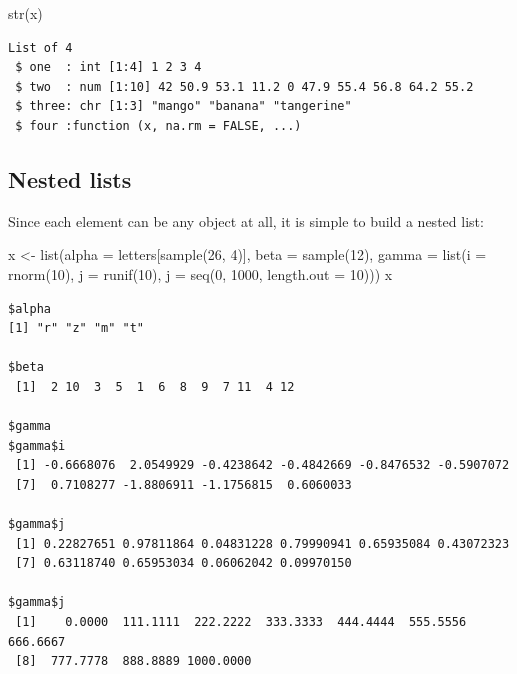 \documentclass[
]{book}
\newenvironment{Shaded}{\begin{snugshade}}{\end{snugshade}}
\newcommand{\AttributeTok}[1]{\textcolor[rgb]{0.77,0.63,0.00}{#1}}
\newcommand{\DecValTok}[1]{\textcolor[rgb]{0.00,0.00,0.81}{#1}}
\newcommand{\FunctionTok}[1]{\textcolor[rgb]{0.00,0.00,0.00}{#1}}
\newcommand{\NormalTok}[1]{#1}
\newcommand{\OtherTok}[1]{\textcolor[rgb]{0.56,0.35,0.01}{#1}}
\begin{document}
\begin{Shaded}
\begin{Highlighting}[]
\FunctionTok{str}\NormalTok{(x)}
\end{Highlighting}
\end{Shaded}

\begin{verbatim}
List of 4
 $ one  : int [1:4] 1 2 3 4
 $ two  : num [1:10] 42 50.9 53.1 11.2 0 47.9 55.4 56.8 64.2 55.2
 $ three: chr [1:3] "mango" "banana" "tangerine"
 $ four :function (x, na.rm = FALSE, ...)  
\end{verbatim}

\hypertarget{nested-lists}{%
\subsection{Nested lists}\label{nested-lists}}

Since each element can be any object at all, it is simple to build a nested list:

\begin{Shaded}
\begin{Highlighting}[]
\NormalTok{x }\OtherTok{\textless{}{-}} \FunctionTok{list}\NormalTok{(}\AttributeTok{alpha =}\NormalTok{ letters[}\FunctionTok{sample}\NormalTok{(}\DecValTok{26}\NormalTok{, }\DecValTok{4}\NormalTok{)],}
          \AttributeTok{beta =} \FunctionTok{sample}\NormalTok{(}\DecValTok{12}\NormalTok{),}
          \AttributeTok{gamma =} \FunctionTok{list}\NormalTok{(}\AttributeTok{i =} \FunctionTok{rnorm}\NormalTok{(}\DecValTok{10}\NormalTok{),}
                       \AttributeTok{j =} \FunctionTok{runif}\NormalTok{(}\DecValTok{10}\NormalTok{),}
                       \AttributeTok{j =} \FunctionTok{seq}\NormalTok{(}\DecValTok{0}\NormalTok{, }\DecValTok{1000}\NormalTok{, }\AttributeTok{length.out =} \DecValTok{10}\NormalTok{)))}
\NormalTok{x}
\end{Highlighting}
\end{Shaded}

\begin{verbatim}
$alpha
[1] "r" "z" "m" "t"

$beta
 [1]  2 10  3  5  1  6  8  9  7 11  4 12

$gamma
$gamma$i
 [1] -0.6668076  2.0549929 -0.4238642 -0.4842669 -0.8476532 -0.5907072
 [7]  0.7108277 -1.8806911 -1.1756815  0.6060033

$gamma$j
 [1] 0.22827651 0.97811864 0.04831228 0.79990941 0.65935084 0.43072323
 [7] 0.63118740 0.65953034 0.06062042 0.09970150

$gamma$j
 [1]    0.0000  111.1111  222.2222  333.3333  444.4444  555.5556  666.6667
 [8]  777.7778  888.8889 1000.0000
\end{verbatim}
\end{document}

